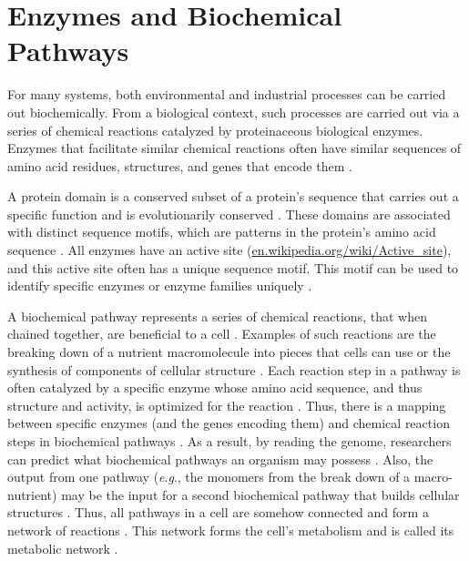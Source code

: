 \section{Enzymes and Biochemical Pathways} \label{enzymes-and-pathways} 

For many systems, both environmental and industrial processes can be carried out 
biochemically. From a biological context, such processes are carried out via a 
series of chemical reactions catalyzed by proteinaceous biological enzymes. 
Enzymes that facilitate similar chemical reactions often have similar sequences 
of amino acid residues, structures, and genes that encode them 
\cite{galperin1998analogous,zhang2003evolution}. 

A protein domain is a conserved subset of a protein's sequence that carries out 
a specific function and is evolutionarily conserved \cite{ren2008conservation}. 
These domains are associated with distinct sequence motifs, which are patterns 
in the protein's amino acid sequence \cite{ren2008conservation}. All enzymes 
have an active site 
(\href{http://en.wikipedia.org/wiki/Active_site}{en.wikipedia.org/wiki/Active\_site}), 
and this active site often has a unique sequence motif. This motif can be used 
to identify specific enzymes or enzyme families uniquely 
\cite{ren2008conservation}. 

A biochemical pathway represents a series of chemical reactions, that when 
chained together, are beneficial to a cell \cite{michal2012biochemical}. 
Examples of such reactions are the breaking down of a nutrient macromolecule 
into pieces that cells can use or the synthesis of components of cellular 
structure \cite{wagner2012metabolic}. Each reaction step in a pathway is often 
\cite{keller2015widespread,tawfik2010enzyme} catalyzed by a specific enzyme 
whose amino acid sequence, and thus structure and activity, is optimized for the 
reaction \cite{michal2012biochemical,zhang2003evolution,fersht1999structure}. 
Thus, there is a mapping between specific enzymes (and the genes encoding them) 
and chemical reaction steps in biochemical pathways \cite{thiele2010protocol}. 
As a result, by reading the genome, researchers can predict what biochemical 
pathways an organism may possess 
\cite{abubucker2012metabolic,thiele2010protocol}. Also, the output from one 
pathway (\textit{e}.\textit{g}., the monomers from the break down of a 
macro-nutrient) may be the input for a second biochemical pathway that builds 
cellular structures \cite{wagner2012metabolic,stelling2002metabolic}. Thus, all 
pathways in a cell are somehow connected and form a network of reactions 
\cite{wagner2012metabolic,stelling2002metabolic}. This network forms the cell's 
metabolism and is called its metabolic network \cite{wagner2012metabolic}.

